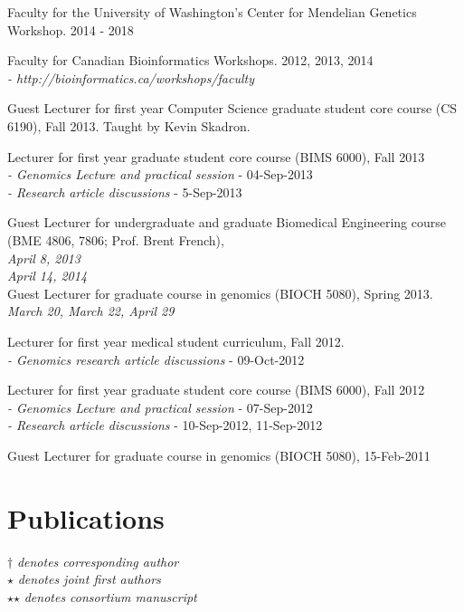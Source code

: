 \documentclass[margin,line]{cv}
\begin{document}
\begin{resume}
    \vspace{-2mm}
    Faculty for the University of Washington's Center for Mendelian Genetics Workshop. 2014 - 2018

    \vspace{-2mm}
    Faculty for Canadian Bioinformatics Workshops. 2012, 2013, 2014 \\
    \emph{- http://bioinformatics.ca/workshops/faculty}

    \vspace{-2mm}
    Guest Lecturer for first year Computer Science graduate student core course (CS 6190), Fall 2013. Taught by Kevin Skadron.

    \vspace{-2mm}
    Lecturer for first year graduate student core course (BIMS 6000), Fall 2013 \\
    \emph{- Genomics Lecture and practical session} - 04-Sep-2013 \\
    \emph{- Research article discussions} - 5-Sep-2013

    \vspace{-2mm}
    Guest Lecturer for undergraduate and graduate Biomedical Engineering course (BME 4806, 7806; Prof. Brent French), \\
    \emph{April 8, 2013} \\
    \emph{April 14, 2014} \\

    Guest Lecturer for graduate course in genomics (BIOCH 5080), Spring 2013. \\
	\emph{March 20, March 22, April 29}

    Lecturer for first year medical student curriculum, Fall 2012. \\
	\emph{- Genomics research article discussions} - 09-Oct-2012

    \vspace{-2mm}
    Lecturer for first year graduate student core course (BIMS 6000), Fall 2012 \\
	\emph{- Genomics Lecture and practical session} - 07-Sep-2012 \\
	\emph{- Research article discussions} - 10-Sep-2012, 11-Sep-2012

    \vspace{-2mm}
    Guest Lecturer for graduate course in genomics (BIOCH 5080), 15-Feb-2011

    \section{\mysidestyle Publications}
    $\dagger$\textit{ denotes corresponding author }\\
    $\star$\textit{ denotes joint first authors }\\
    $\star$$\star$\textit{ denotes consortium manuscript }


\end{resume}
\end{document}
